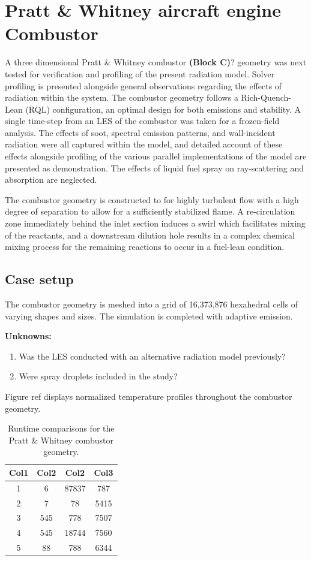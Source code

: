 \section{Pratt \& Whitney aircraft engine Combustor}
A three dimensional Pratt \& Whitney combustor  \textbf{(Block C)}? geometry was next tested for verification and profiling of the present radiation model. Solver profiling is presented alongside general observations regarding the effects of radiation within the system.
The combustor geometry follows a Rich-Quench-Lean (RQL) configuration, an optimal design for both emissions and stability.
A single time-step from an LES of the combustor was taken for a frozen-field analysis. The effects of soot, spectral emission patterns, and wall-incident radiation were all captured within the model, and detailed account of these effects alongside profiling of the various parallel implementations of the model are presented as demonstration.
The effects of liquid fuel spray on ray-scattering and absorption are neglected.

The combustor geometry is constructed to for highly turbulent flow with a high degree of separation to allow for a sufficiently stabilized flame.
A re-circulation zone immediately behind the inlet section induces a swirl which facilitates mixing of the reactants, and a downstream dilution hole results in a complex chemical mixing process for the remaining reactions to occur in a fuel-lean condition. 



\subsection{Case setup}
The combustor geometry is meshed into a grid of 16,373,876 hexahedral cells of varying shapes and sizes. The simulation is completed with adaptive emission.



\textbf{Unknowns:}
\begin{enumerate}
    \item Was the LES conducted with an alternative radiation model previously?
    \item Were spray droplets included in the study?
\end{enumerate}

Figure ref{} displays normalized temperature profiles throughout the combustor geometry.


\begin{table}[h!]
\centering
\begin{tabular}{||c c c c||} 
 \hline
 Col1 & Col2 & Col2 & Col3 \\ [0.5ex] 
 \hline\hline
 1 & 6 & 87837 & 787 \\ 
 2 & 7 & 78 & 5415 \\
 3 & 545 & 778 & 7507 \\
 4 & 545 & 18744 & 7560 \\
 5 & 88 & 788 & 6344 \\ [1ex] 
 \hline
\end{tabular}
\caption{Runtime comparisons for the Pratt \& Whitney combustor geometry.}
\label{table:PW_runtime_table}
\end{table}
